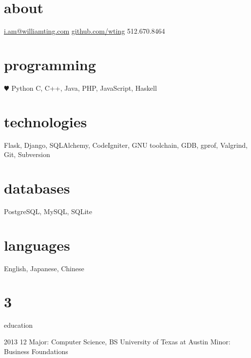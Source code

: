 \documentclass[]{friggeri-cv}
\begin{document}

\begin{aside}
  \section{about}
  \href{mailto:i.am@williamting.com}{i.am@williamting.com}
  \href{https://github.com/wting}{github.com/wting}
  512.670.8464
  \section{programming}
  {\color{red} $\varheartsuit$} Python
  C, C++, Java,
  PHP, JavaScript,
  Haskell
  \section{technologies}
  Flask, Django,
  SQLAlchemy, CodeIgniter,
  GNU toolchain,
  GDB, gprof, Valgrind,
  Git, Subversion
  \section{databases}
  PostgreSQL,
  MySQL, SQLite
  \section{languages}
  English,
  Japanese, Chinese
\end{aside}

\section{3}{education}

\begin{entrylist}
  \entry
  {2013 12}
  {Major: Computer Science, BS}
  {University of Texas at Austin}
  {Minor: Business Foundations}
\end{entrylist}



\end{document}
